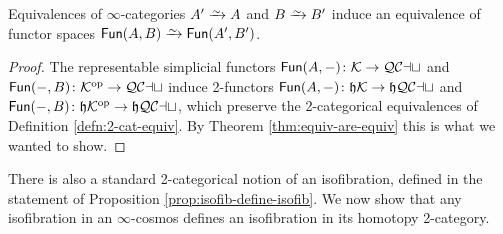   \begin{cor}\label{cor:equiv-invar-fun} Equivalences of $\infty$-categories $A' \we A$ and $B \we B'$ induce an equivalence of functor spaces $\Fun(A,B) \we \Fun(A',B')$.
  \end{cor}
  \begin{proof}
  The representable simplicial functors ${\mathord{\mathsf{Fun}}}(A,-)\colon {\mathord{\mathcal{K}}} \to {\mathord{\mathcal{QCat}}}$ and ${\mathord{\mathsf{Fun}}}(-,B)\colon {\mathord{\mathcal{K}}}^{\mathord{\textup{op}}} \to {\mathord{\mathcal{QCat}}}$ induce 2-functors ${\mathord{\mathsf{Fun}}}(A,-)\colon\mathfrak{h}{\mathord{\mathcal{K}}}\to\mathfrak{h}{\mathord{\mathcal{QCat}}}$ and ${\mathord{\mathsf{Fun}}}(-,B)\colon\mathfrak{h}{\mathord{\mathcal{K}}}^{\mathord{\textup{op}}}\to\mathfrak{h}{\mathord{\mathcal{QCat}}}$, which preserve the 2-cat\-e\-go\-ri\-cal equivalences of Definition \ref{defn:2-cat-equiv}. By Theorem \ref{thm:equiv-are-equiv} this is what we wanted to show.
  \end{proof}

  There is also a standard 2-categorical notion of an isofibration, defined in the statement of Proposition \ref{prop:isofib-define-isofib}. %
   We now show that any isofibration in an $\infty$-cosmos defines an isofibration in its homotopy 2-category.

